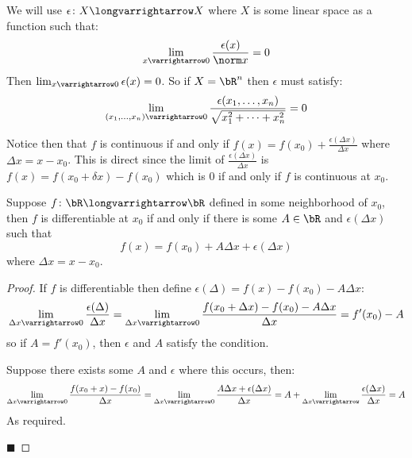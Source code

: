 \documentclass[10pt]{article}
\begin{document}


\bigskip

We will use $\epsilon\colon X\longvarrightarrow X$ where $X$ is some linear space as a function such that:
\[ \lim_{x\varrightarrow0}\frac{\epsilon(x)}{\norm x} = 0 \]
Then $\lim_{x\varrightarrow0}\epsilon(x)=0$.
So if $X=\bR^n$ then $\epsilon$ must satisfy:
\[ \lim_{(x_1,\dots,x_n)\varrightarrow0}\frac{\epsilon(x_1,\dots,x_n)}{\sqrt{x_1^2+\cdots+x_n^2}} = 0 \]

Notice then that $f$ is continuous if and only if $f(x)=f(x_0)+\frac{\epsilon(\Delta x)}{\Delta x}$ where $\Delta x=x-x_0$.
This is direct since the limit of $\frac{\epsilon(\Delta x)}{\Delta x}$ is $f(x)=f(x_0+\delta x)-f(x_0)$ which is $0$ if and only if $f$ is continuous at $x_0$.

\begin{prop*}

    Suppose $f\colon\bR\longvarrightarrow\bR$ defined in some neighborhood of $x_0$, then $f$ is differentiable at $x_0$ if and only if there is some $A\in\bR$ and $\epsilon(\Delta x)$ such that
    \[ f(x) = f(x_0) + A\Delta x + \epsilon(\Delta x) \]
    where $\Delta x = x-x_0$.

\end{prop*}

\begin{proof}

    If $f$ is differentiable then define $\epsilon(\Delta)=f(x)-f(x_0)-A\Delta x$:
    \[ \lim_{\Delta x\varrightarrow0}\frac{\epsilon(\Delta)}{\Delta x} = \lim_{\Delta x\varrightarrow0}\frac{f(x_0+\Delta x)-f(x_0) - A\Delta x}{\Delta x} = f'(x_0) - A \]
    so if $A=f'(x_0)$, then $\epsilon$ and $A$ satisfy the condition.

    Suppose there exists some $A$ and $\epsilon$ where this occurs, then:
    \[ \lim_{\Delta x\varrightarrow0}\frac{f(x_0+x)-f(x_0)}{\Delta x} = \lim_{\Delta x\varrightarrow0}\frac{A\Delta x+\epsilon(\Delta x)}{\Delta x} =
    A + \lim_{\Delta x\varrightarrow}\frac{\epsilon(\Delta x)}{\Delta x} = A \]
    As required.

    \hfill$\blacksquare$

\end{proof}
\end{document}
